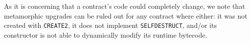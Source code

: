 As it is concerning that a contract's code could completely change, we note that metamorphic upgrades can be ruled out for any contract where either: it was not created with \texttt{CREATE2}, it does not implement \texttt{SELFDESTRUCT}, and/or its constructor is not able to dynamically modify its runtime bytecode. 







